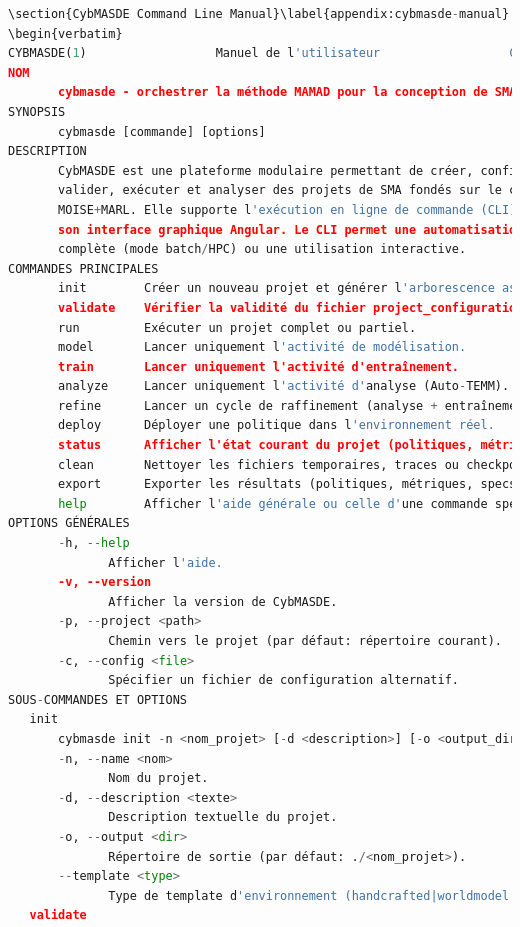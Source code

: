 \begin{lstlisting}[language=Python,basicstyle=\scriptsize, label={lst:cybmasde_environment_api}, caption={Excerpt from the template file to be used to implement the environmental API.}]
\section{CybMASDE Command Line Manual}\label{appendix:cybmasde-manual}
\begin{verbatim}
CYBMASDE(1)                  Manuel de l'utilisateur                  CYBMASDE(1)
NOM
       cybmasde - orchestrer la méthode MAMAD pour la conception de SMA
SYNOPSIS
       cybmasde [commande] [options]
DESCRIPTION
       CybMASDE est une plateforme modulaire permettant de créer, configurer,
       valider, exécuter et analyser des projets de SMA fondés sur le cadre
       MOISE+MARL. Elle supporte l'exécution en ligne de commande (CLI) ou via
       son interface graphique Angular. Le CLI permet une automatisation
       complète (mode batch/HPC) ou une utilisation interactive.
COMMANDES PRINCIPALES
       init        Créer un nouveau projet et générer l'arborescence associée.
       validate    Vérifier la validité du fichier project_configuration.json et des dépendances.
       run         Exécuter un projet complet ou partiel.
       model       Lancer uniquement l'activité de modélisation.
       train       Lancer uniquement l'activité d'entraînement.
       analyze     Lancer uniquement l'activité d'analyse (Auto-TEMM).
       refine      Lancer un cycle de raffinement (analyse + entraînement).
       deploy      Déployer une politique dans l'environnement réel.
       status      Afficher l'état courant du projet (politiques, métriques, logs).
       clean       Nettoyer les fichiers temporaires, traces ou checkpoints inutiles.
       export      Exporter les résultats (politiques, métriques, specs. org.) au format JSON/CSV.
       help        Afficher l'aide générale ou celle d'une commande spécifique.
OPTIONS GÉNÉRALES
       -h, --help
              Afficher l'aide.
       -v, --version
              Afficher la version de CybMASDE.
       -p, --project <path>
              Chemin vers le projet (par défaut: répertoire courant).
       -c, --config <file>
              Spécifier un fichier de configuration alternatif.
SOUS-COMMANDES ET OPTIONS
   init
       cybmasde init -n <nom_projet> [-d <description>] [-o <output_dir>]
       -n, --name <nom>
              Nom du projet.
       -d, --description <texte>
              Description textuelle du projet.
       -o, --output <dir>
              Répertoire de sortie (par défaut: ./<nom_projet>).
       --template <type>
              Type de template d'environnement (handcrafted|worldmodel|minimal).
   validate

\end{lstlisting}
